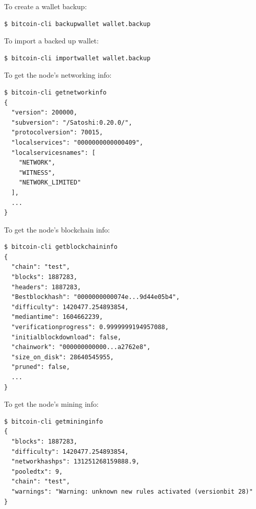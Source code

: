 \noindent To create a wallet backup:
\begin{emphbox}
\begin{lstlisting}[style=Bash]
$ bitcoin-cli backupwallet wallet.backup
\end{lstlisting}
\end{emphbox}
\vspace{1em}

\noindent To import a backed up wallet:
\begin{emphbox}
\begin{lstlisting}[style=Bash]
$ bitcoin-cli importwallet wallet.backup
\end{lstlisting}
\end{emphbox}
\vspace{1em}

\noindent To get the node's networking info:
\begin{emphbox}
\begin{lstlisting}[style=Bash]
$ bitcoin-cli getnetworkinfo
{
  "version": 200000,
  "subversion": "/Satoshi:0.20.0/",
  "protocolversion": 70015,
  "localservices": "0000000000000409",
  "localservicesnames": [
    "NETWORK",
    "WITNESS",
    "NETWORK_LIMITED"
  ],
  ... 
}
\end{lstlisting}
\end{emphbox}
\vspace{1em}

\noindent To get the node's blockchain info:
\begin{emphbox}
\begin{lstlisting}[style=Bash]
$ bitcoin-cli getblockchaininfo
{
  "chain": "test",
  "blocks": 1887283,
  "headers": 1887283,
  "Bestblockhash": "0000000000074e...9d44e05b4",
  "difficulty": 1420477.254893854,
  "mediantime": 1604662239,
  "verificationprogress": 0.9999999194957088,
  "initialblockdownload": false,
  "chainwork": "000000000000...a2762e8",
  "size_on_disk": 28640545955,
  "pruned": false,
  ...
}
\end{lstlisting}
\end{emphbox}
\vspace{1em}

\noindent To get the node's mining info:
\begin{emphbox}
\begin{lstlisting}[style=Bash]
$ bitcoin-cli getmininginfo
{
  "blocks": 1887283,
  "difficulty": 1420477.254893854,
  "networkhashps": 131251268159888.9,
  "pooledtx": 9,
  "chain": "test",
  "warnings": "Warning: unknown new rules activated (versionbit 28)"
}
\end{lstlisting}
\end{emphbox}
\vspace{1em}

